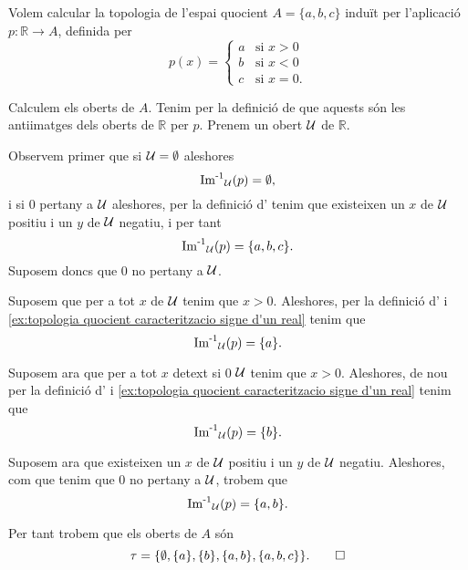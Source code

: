 \documentclass[../../Main.tex]{subfiles}
\begin{document}
	\begin{example}
		Volem calcular la topologia de l'espai quocient \(A=\{a,b,c\}\) induït per l'aplicació \(p\colon\mathbb{R}\longrightarrow A\), definida per
		\begin{equation}
			\label{ex:topologia quocient caracteritzacio signe d'un real}
			p(x)=\begin{cases}
				a & \text{si }x>0 \\
				b & \text{si }x<0 \\
				c & \text{si }x=0.
			\end{cases}
		\end{equation}
		\begin{solution}
			Calculem els oberts de \(A\). Tenim per la definició de  que aquests són les antiimatges dels oberts de \(\mathbb{R}\) per \(p\). Prenem un obert \(\mathcal{U}\) de \(\mathbb{R}\).
			
			Observem primer que si \(\mathcal{U}=\emptyset\) aleshores
			\[
			    \operatorname{\operatorname{Im}^{-1}}_{\mathcal{U}}(p)=\emptyset,
			\]
			i si \(0\) pertany a \(\mathcal{U}\) aleshores, per la definició d' tenim que existeixen un \(x\) de \(\mathcal{U}\) positiu i un \(y\) de \(\mathcal{U}\) negatiu, i per tant
			\[
			    \operatorname{\operatorname{Im}^{-1}}_{\mathcal{U}}(p)=\{a,b,c\}.
			\]
			Suposem doncs que \(0\) no pertany a \(\mathcal{U}\).
			
			Suposem que per a tot \(x\) de \(\mathcal{U}\) tenim que \(x>0\). Aleshores, per la definició d' i \eqref{ex:topologia quocient caracteritzacio signe d'un real} tenim que
			\[
			    \operatorname{\operatorname{Im}^{-1}}_{\mathcal{U}}(p)=\{a\}.
			\]
			
			Suposem ara que per a tot \(x\) detext{ si }0 \(\mathcal{U}\) tenim que \(x>0\). Aleshores, de nou per la definició d' i \eqref{ex:topologia quocient caracteritzacio signe d'un real} tenim que
			\[
			    \operatorname{\operatorname{Im}^{-1}}_{\mathcal{U}}(p)=\{b\}.
			\]
			
			Suposem ara que existeixen un \(x\) de \(\mathcal{U}\) positiu i un \(y\) de \(\mathcal{U}\) negatiu. Aleshores, com que tenim que \(0\) no pertany a \(\mathcal{U}\), trobem que
			\[
			    \operatorname{\operatorname{Im}^{-1}}_{\mathcal{U}}(p)=\{a,b\}.
			\]
			
			Per tant trobem que els oberts de \(A\) són
			\[
			    \tau=\{\emptyset,\{a\},\{b\},\{a,b\},\{a,b,c\}\}.\qedhere
			\]
		\end{solution}
	\end{example}
\end{document}

